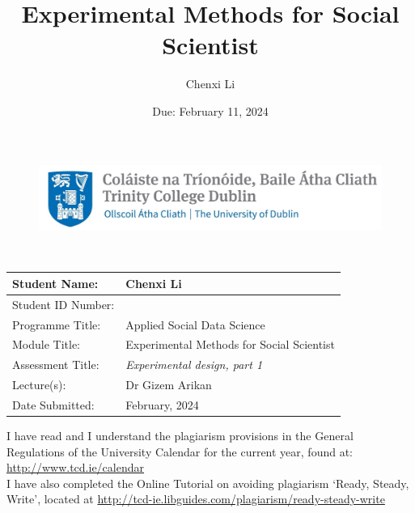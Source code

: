 \documentclass[12pt]{article} %
\title{Experimental Methods for Social Scientist }
\date{Due: February 11, 2024}
\author{Chenxi Li}
\begin{document}
\begin{figure}[h]
	\centering
	\vspace{-2.5cm}
	\hspace{-8cm}
	\includegraphics[width=12cm]{Trinity_icon.jpg}  
\end{figure}

\vspace{.5cm}
\begin{center}
\\
\end{center}

\vspace{.7cm}


\begin{center}
		\begin{tabular}{|>{\arraybackslash}p{4cm}|>{\arraybackslash}p{8cm}|}
			\hline
			Student Name: & Chenxi Li\\
			\hline
			Student ID Number: & 23330541 \\
			\hline
			Programme Title: & Applied Social Data Science \\
			\hline
			Module Title: & Experimental Methods for Social Scientist \\
			\hline
			Assessment Title: & \textit{Experimental design, part 1 }\\
			\hline
			Lecture(s): & Dr Gizem Arikan \\
			\hline
			Date Submitted: & 11 February, 2024 \\
			\hline
		\end{tabular}
\end{center}

\vspace{.7cm}

\noindent I have read and I understand the plagiarism provisions in the General Regulations of the University Calendar for the current year, found at:  \url{http://www.tcd.ie/calendar} \\

\noindent I have also completed the Online Tutorial on avoiding plagiarism ‘Ready, Steady, Write’, located at \url{http://tcd-ie.libguides.com/plagiarism/ready-steady-write} \\
\end{document}
